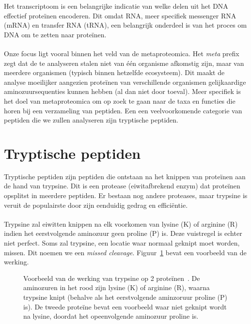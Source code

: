 Het transcriptoom is een belangrijke indicatie van welke delen uit het DNA effectief proteïnen encoderen.
Dit omdat RNA, meer specifiek messenger RNA (mRNA) en transfer RNA (tRNA), een belangrijk onderdeel is van het proces om DNA om te zetten naar proteïnen.
\\ \\
Onze focus ligt vooral binnen het veld van de metaproteomica.
Het \textit{meta} prefix zegt dat de te analyseren stalen niet van één organisme afkomstig zijn, maar van meerdere organismen (typisch binnen hetzelfde ecosysteem).
Dit maakt de analyse moeilijker aangezien proteïnen van verschillende organismen gelijkaardige aminozuursequenties kunnen hebben (al dan niet door toeval).
Meer specifiek is het doel van metaproteomica om op zoek te gaan naar de taxa en functies die horen bij een verzameling van peptiden.
Een een veelvoorkomende categorie van peptiden die we zullen analyseren zijn tryptische peptiden.

\section{Tryptische peptiden}\label{sec:tryptische-peptiden}
Tryptische peptiden zijn peptiden die ontstaan na het knippen van proteïnen aan de hand van trypsine.
Dit is een protease (eiwitafbrekend enzym) dat proteïnen opsplitst in meerdere peptiden.
Er bestaan nog andere proteases, maar trypsine is veruit de populairste door zijn eenduidig gedrag en efficiëntie.
\\ \\
Trypsine zal eiwitten knippen na elk voorkomen van lysine (K) of arginine (R) indien het eerstvolgende aminozuur geen proline (P) is.
Deze vuistregel is echter niet perfect.
Soms zal trypsine, een locatie waar normaal geknipt moet worden, missen.
Dit noemen we een \textit{missed cleavage}.
Figuur~\ref{fig:trypsine} bevat een voorbeeld van de werking.

\begin{figure}[H]
    \centering
    
    \caption{Voorbeeld van de werking van trypsine op 2 proteïnen~\cite{phdPieterUnipept}. De aminozuren in het rood zijn lysine (K) of arginine (R), waarna trypsine knipt (behalve als het eerstvolgende aminzoruur proline (P) is). De tweede proteïne bevat een voorbeeld waar niet geknipt wordt na lysine, doordat het opeenvolgende aminozuur proline is.}
    \label{fig:trypsine}
\end{figure}

